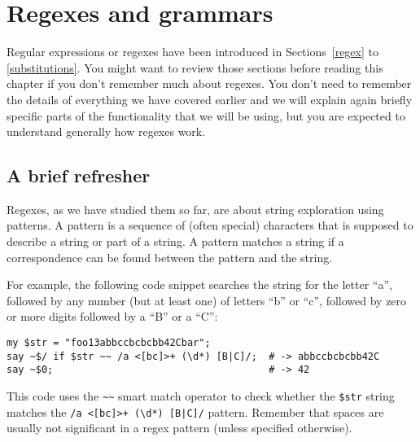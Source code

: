 


\chapter{Regexes and grammars}
\label{regex_grammars}

Regular expressions or regexes have been introduced in
Sections~\ref{regex} to \ref{substitutions}. You might want to review
those sections before reading this chapter if you don't
remember much about regexes. You don't need to remember the details of
everything we have covered earlier and we will explain again briefly
specific parts of the functionality that we will be using, but you are
expected to understand generally how regexes work.

\section{A brief refresher}

Regexes, as we have studied 
them so far, are about string exploration using patterns. 
A pattern is a sequence of (often special) characters that 
is supposed to describe a string or part of a string. A 
pattern matches a string if a correspondence can be found 
between the pattern and the string. 

For example, the 
following code snippet searches the string for the letter 
``a'', followed by any number (but at least one) of letters 
``b'' or ``c'', followed by zero or more digits followed by
a ``B'' or a ``C'':

\begin{verbatim}
my $str = "foo13abbccbcbcbb42Cbar";
say ~$/ if $str ~~ /a <[bc]>+ (\d*) [B|C]/;  # -> abbccbcbcbb42C
say ~$0;                                     # -> 42
\end{verbatim}

This code uses the \verb'~~' smart match operator to 
check whether the \verb'$str' string matches the 
\verb'/a <[bc]>+ (\d*) [B|C]/' pattern. Remember that 
spaces are usually not significant in a regex pattern 
(unless specified otherwise).

